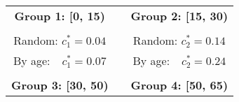 \documentclass[12pt]{article}
\begin{document}
\begin{figure}[hp]
\begin{center}%
\begin{tabular}
[c]{ccc}%
\textbf{Group 1: [0, 15)} &  & \textbf{Group 2: [15, 30)}\\%
{\includegraphics[
height=1.7772in,
width=2.3618in
]%
{figs/theory_cmp_random_oldfirst_dist_vacc_pct50_eff95_Wbeg10_8W_dcT_L1.png}%
}
&  &
{\includegraphics[
height=1.7772in,
width=2.3618in
]%
{figs/theory_cmp_random_oldfirst_dist_vacc_pct50_eff95_Wbeg10_8W_dcT_L2.png}%
}
\\
Random: $c_{1}^{\ast}=0.04$ &  & Random: $c_{2}^{\ast}=0.14$\\
By age: \ $\ c_{1}^{\ast}=0.07$ &  & By age: \ $\ c_{2}^{\ast}=0.24$\\
&  & \\
\textbf{Group 3: [30, 50)} &  & \textbf{Group 4: [50, 65)}\\%

\end{tabular}
\end{center}
\end{figure}
\end{document}
